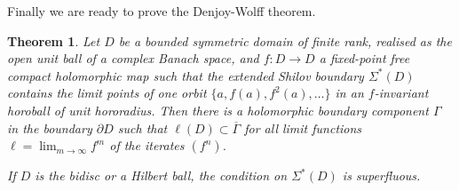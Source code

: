\documentclass[12pt, twoside]{article}
\newtheorem{theorem}{Theorem}[section]
\theoremstyle{definition}
\numberwithin{equation}{section}
\begin{document}
 Finally we are ready to prove the Denjoy-Wolff theorem.

 \begin{theorem}\label{dw}
Let $D$ be a bounded symmetric domain of finite rank, realised as the open unit ball of a complex Banach space,  and  $f: D
  \longrightarrow D$  a fixed-point free compact holomorphic map such that
  the extended Shilov boundary $\Sigma^*(D)$ contains the limit points of one orbit $\{a, f(a), f^2(a), \ldots \}$
  in an $f$-invariant horoball of unit hororadius.
Then there is a holomorphic boundary component $\Gamma$ in the boundary $\partial D$ such that
$\ell(D) \subset \overline \Gamma$ for all limit functions
$\displaystyle \ell= \lim_{m\rightarrow \infty} f^{m}$ of the iterates
$(f^n)$.

If $D$ is the bidisc or a Hilbert ball, the condition on $\Sigma^*(D)$ is superfluous.
\end{theorem}
\end{document}
